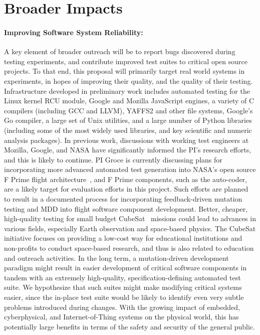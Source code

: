 \section{Broader Impacts}

\paragraph{Improving Software System Reliability:} A key element of
broader outreach will be to report bugs discovered during testing
experiments, and contribute improved test suites to critical open
source projects.  To that end, this proposal will primarily target real world
systems in experiments, in hopes of improving their quality, and
the quality of their testing.  Infrastructure developed in preliminary
work includes automated testing for
the Linux kernel RCU module, Google and Mozilla JavaScript engines, a
variety of C compilers (including GCC and LLVM), YAFFS2 \cite{yaffs2}
and other file systems, Google's Go compiler, a large set of Unix
utilities, and a large number of Python libraries (including some of
the most widely used libraries, and key scientific and numeric
analysis packages).  In previous work, discussions with working test
engineers at Mozilla, Google, and NASA have significantly informed the PI's
research efforts, and this is likely to continue.  PI Groce is
currently discussing plans for incorporating more advanced automated
test generation into NASA's open source F Prime flight
architecture~\cite{fprime,fprimerepo}, 
and F Prime components, such as the auto-coder, are a likely target
for evaluation efforts in this project.  Such efforts are planned to
result in a documented process for incorporating feedback-driven
mutation testing and MDD into flight software component development.
Better, cheaper, high-quality testing for small budget CubeSat~\cite{CubeSat}
missions could lead to advances in various fields, especially Earth
observation and space-based physics.  The CubeSat initiative focuses on providing a
low-cost way for educational institutions and non-profits to conduct space-based
research, and thus is also related to education and outreach
activities.
In the long term,
a mutation-driven development paradigm might result in
easier development of critical software components in tandem with an
extremely high-quality, specification-defining automated test suite.
We hypothesize that such suites might make modifying critical systems
easier, since the in-place test suite would be likely to identify even
very subtle problems introduced during changes.  With the growing
impact of embedded, cyberphysical, and Internet-of-Thing systems on
the physical world, this has potentially large benefits in terms of the safety and security
of the general public.

